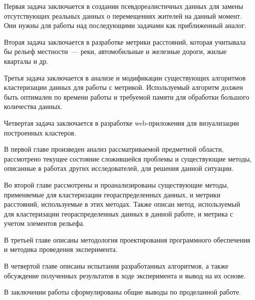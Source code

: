 Первая задача заключается в создании псевдореалистичных данных для замены отсутствующих реальных данных о перемещениях жителей на данный момент. Они нужны для работы над последующими задачами как приближенный аналог.

Вторая задача заключается в разработке метрики расстояний, которая учитывала бы рельеф местности~--- реки, автомобильные и железные дороги, жилые кварталы и др.

Третья задача заключается в анализе и модификации существующих алгоритмов кластеризации данных для работы с метрикой. Используемый алгоритм должен быть оптимален по времени работы и требуемой памяти для обработки большого количества данных.

Четвертая задача заключается в разработке web-приложения для визуализации построенных кластеров.

В первой главе произведен анализ рассматриваемой предметной области, рассмотрено текущее состояние сложившейся проблемы и существующие методы, описанные в работах других исследователей, для решения данной ситуации.

Во второй главе рассмотрены и проанализированы существующие методы, применяемые для кластеризации геораспределенных данных, и метрики расстояний, используемые в этих методах. Также описан метод, используемый для кластеризации геораспределенных данных в данной работе, и метрика с учетом элементов рельефа.

В третьей главе описаны методология проектирования программного обеспечения и методика проведения эксперимента.

В четвертой главе описаны испытания разработанных алгоритмов, а также обсуждение полученных результатов в ходе эксперимента и вывод на их основе.

В заключении работы сформулированы общие выводы по проделанной работе.
